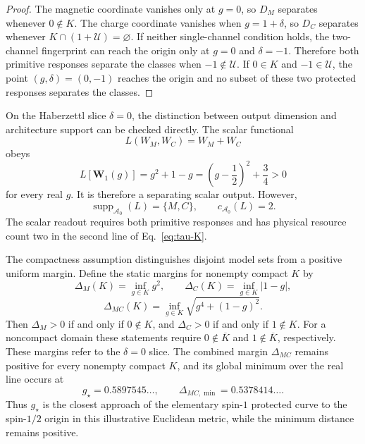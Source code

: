 \documentclass[12pt]{iopjournal}
\theoremstyle{definition}
\theoremstyle{remark}
\begin{document}
\begin{proof}
The magnetic coordinate vanishes only at $g=0$, so $D_M$ separates whenever $0\notin K$. The charge coordinate vanishes when $g=1+\delta$, so $D_C$ separates whenever $K\cap(1+\mathcal U)=\varnothing$. If neither single-channel condition holds, the two-channel fingerprint can reach the origin only at $g=0$ and $\delta=-1$. Therefore both primitive responses separate the classes when $-1\notin\mathcal U$. If $0\in K$ and $-1\in\mathcal U$, the point $(g,\delta)=(0,-1)$ reaches the origin and no subset of these two protected responses separates the classes.
\end{proof}

On the Haberzettl slice $\delta=0$, the distinction between output dimension and architecture support can be checked directly. The scalar functional
\begin{equation}
L(W_M,W_C)=W_M+W_C
\end{equation}
obeys
\begin{equation}
L[\bm W_1(g)]=g^2+1-g
=\left(g-\frac12\right)^2+\frac34>0
\end{equation}
for every real $g$. It is therefore a separating scalar output. However,
\begin{equation}
\operatorname{supp}_{\mathcal A_0}(L)=\{M,C\},
\qquad c_{\mathcal A_0}(L)=2.
\end{equation}
The scalar readout requires both primitive responses and has physical resource count two in the second line of Eq.~\eqref{eq:tau-K}.

The compactness assumption distinguishes disjoint model sets from a positive uniform margin. Define the static margins for nonempty compact $K$ by
\begin{equation}
\Delta_M(K)=\inf_{g\in K}g^2,
\qquad
\Delta_C(K)=\inf_{g\in K}|1-g|,
\end{equation}
\begin{equation}
\Delta_{MC}(K)=\inf_{g\in K}\sqrt{g^4+(1-g)^2}.
\label{eq:K-margins}
\end{equation}
Then $\Delta_M>0$ if and only if $0\notin K$, and $\Delta_C>0$ if and only if $1\notin K$. For a noncompact domain these statements require $0\notin\overline K$ and $1\notin\overline K$, respectively. These margins refer to the $\delta=0$ slice. The combined margin $\Delta_{MC}$ remains positive for every nonempty compact $K$, and its global minimum over the real line occurs at
\begin{equation}
g_\star=0.5897545\ldots,
\qquad
\Delta_{MC,\min}=0.5378414\ldots.
\end{equation}
Thus $g_\star$ is the closest approach of the elementary spin-$1$ protected curve to the spin-$1/2$ origin in this illustrative Euclidean metric, while the minimum distance remains positive.
\end{document}
